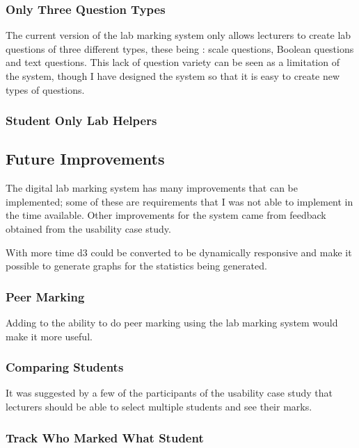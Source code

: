 \documentclass[12pt]{article}  %
\begin{document}
\subsubsection{Only Three Question Types}

The current version of the lab marking system only allows lecturers to create lab questions of three different types, these being : scale questions, Boolean questions and text questions. This lack of question variety can be seen as a limitation of the system, though I have designed the system so that it is easy to create new types of questions.

\subsubsection{Student Only Lab Helpers}




\subsection{Future Improvements}
The digital lab marking system has many improvements that can be implemented; some of these are requirements that I was not able to implement in the time available. Other improvements for the system came from feedback obtained from the usability case study. 

With more time d3 could be converted to be dynamically responsive and make it possible to generate graphs for the statistics being generated.

\subsubsection{Peer Marking}

Adding to the ability to do peer marking using the lab marking system would make it more useful.

\subsubsection{Comparing Students}

It was suggested by a few of the participants of the usability case study that lecturers should be able to select multiple students and see their marks.

\subsubsection{Track Who Marked What Student}
\end{document}
